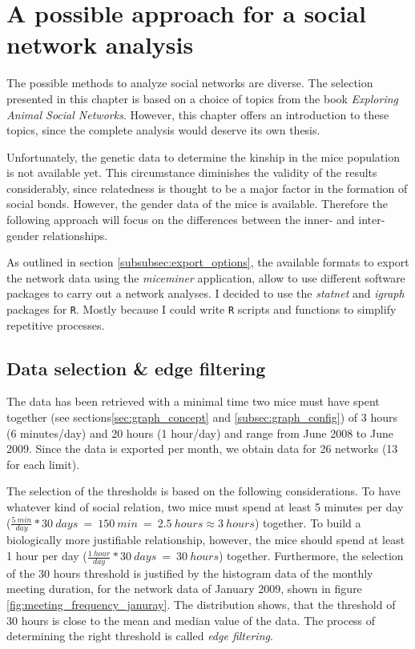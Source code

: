 \section{A possible approach for a social network analysis}
\label{sec:network_analysis}

The possible methods to analyze social networks are diverse. The selection presented in this chapter is based on a choice of topics from the book \textit{Exploring Animal Social Networks}\citep{croft:07}. However, this chapter offers an introduction to these topics, since the complete analysis would deserve its own thesis. 

Unfortunately, the genetic data to determine the kinship in the mice population is not available yet. This circumstance diminishes the validity of the results considerably, since relatedness is thought to be a major factor in the formation of social bonds. However, the gender data of the mice is available. Therefore the following approach will focus on the differences between the inner- and inter-gender relationships.

As outlined in section \ref{subsubsec:export_options}, the available formats to export the network data using the \textit{miceminer} application, allow to use different software packages to carry out a network analyses. I decided to use the \textit{statnet}\citep{statnet:03} and \textit{igraph}\citep{igraph:06} packages for \lstinline|R|\citep{r:05}. Mostly because I could write \lstinline|R| scripts and functions to simplify repetitive processes.

\subsection{Data selection \& edge filtering}
\label{subsec:data_selection}

The data has been retrieved with a minimal time two mice must have spent together (see sections\ref{sec:graph_concept} and \ref{subsec:graph_config}) of 3 hours (6 minutes/day) and 20 hours (1 hour/day) and range from June 2008 to June 2009. Since the data is exported per month, we obtain data for 26 networks (13 for each limit).

The selection of the thresholds is based on the following considerations. To have whatever kind of social relation, two mice must spend at least 5 minutes per day ($\frac{5\:min}{day} * 30\:days\:=\:150\:min\:=\:2.5\:hours \approx 3\:hours$) together. To build a biologically more justifiable relationship, however, the mice should spend at least 1 hour per day ($\frac{1\:hour}{day} * 30\:days\:=\:30\:hours$) together.  Furthermore, the selection of the 30 hours threshold is justified by the histogram data of the monthly meeting duration, for the network data of January 2009, shown in figure \ref{fig:meeting_frequency_januray}. The distribution shows, that the threshold of 30 hours is close to the mean and median value of the data. The process of determining the right threshold is called \textit{edge filtering}.

